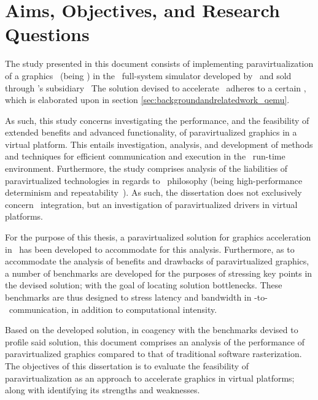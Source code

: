 
\chapter{Aims, Objectives, and Research Questions}
\label{cha:aimsandobjectives}
The study presented in this document consists of implementing paravirtualization of a graphics \dvttermapi\ (being \dvttermopenglestwopointo ) in the \dvttermsimics\ full-system simulator developed by \dvttermintel\ and sold through \dvttermintel 's subsidiary \dvttermwindriver\ 
The solution devised to accelerate \dvttermopengl\ adheres to a certain \dvttermreferencesolution , which is elaborated upon in section \ref{sec:backgroundandrelatedwork_qemu}.

As such, this study concerns investigating the performance, and the feasibility of extended benefits and advanced functionality, of paravirtualized graphics in a virtual platform.
This entails investigation, analysis, and development of methods and techniques for efficient communication and execution in the \dvttermsimics\ run-time environment.
Furthermore, the study comprises analysis of the liabilities of paravirtualized technologies in regards to \dvttermsimics\ philosophy (being high-performance determinism and repeatability~).
As such, the dissertation does not exclusively concern \dvttermsimics\ integration, but an investigation of paravirtualized drivers in virtual platforms.

For the purpose of this thesis, a paravirtualized solution for graphics acceleration in \dvttermsimics\ has been developed to accommodate for this analysis.
Furthermore, as to accommodate the analysis of benefits and drawbacks of paravirtualized graphics, a number of benchmarks are developed for the purposes of stressing key points in the devised solution; with the goal of locating solution bottlenecks.
These benchmarks are thus designed to stress latency and bandwidth in \dvttermtarget -to-\dvttermhost\ communication, in addition to computational intensity.

Based on the developed solution, in coagency with the benchmarks devised to profile said solution, this document comprises an analysis of the performance of paravirtualized graphics compared to that of traditional software rasterization.
The objectives of this dissertation is to evaluate the feasibility of paravirtualization as an approach to accelerate graphics in virtual platforms; along with identifying its strengths and weaknesses.

